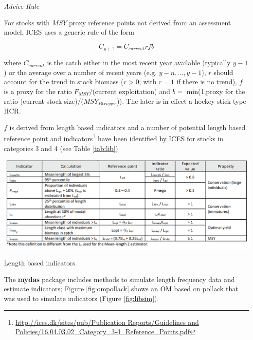 \textit{Advice Rule}

For stocks with $MSY$ proxy reference points not derived from an assessment model, ICES uses a generic rule of the form 
 
\begin{equation}C_{y+1}=C_{current}rfb\end{equation}

where $C_{current}$ is the catch either in the most recent year available (typically $y-1$) or the average over a number of recent years (e.g. $y-n, ... ,y-1$), $r$ should account for the trend in stock biomass ($r>0$; with $r=1$ if there is no trend), $f$  is a proxy for the ratio $F_{MSY}/$(current exploitation) and $b=$ min(1,proxy for the ratio (current stock size)/($MSY_{Btrigger}$)). The later is in effect a hockey stick type HCR. 

$f$ is derived from length based indicators and a number of potential length based reference point and indicators\footnote{\url{http://ices.dk/sites/pub/Publication Reports/Guidelines and Policies/16.04.03.02_Category_3-4_Reference_Points.pdf}} have been identified by ICES for stocks in categories 3 and 4 (see Table \ref{tab:lib}) 

\begin{table}[h!]\centering
\includegraphics[width=\textwidth]{figs/lib.png}
\caption{Length based indicators.} %
\label{tab:lib}
\end{table}

The \textbf{mydas} package includes methods to simulate length frequency data and estimate indicators; Figure \ref{fig:ompollack} shows an OM based on pollack that was used to simulate indicators (Figure \ref{fig:libsim}).

